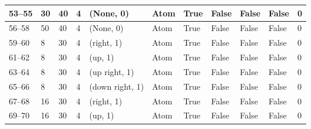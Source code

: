 \begin{longtable}{|C{0.9cm}|C{0.8cm}|C{0.8cm}|C{0.8cm}|C{3cm}|C{1.5cm}|C{1.5cm}|C{0.8cm}|C{0.8cm}|C{1cm}|C{1cm}|}
    53--55 &  30 &  40 &  4 & (None, 0) & Atom & True & False & False & False & 0 \\ \hline

    56--58 &  50 &  40 &  4 & (None, 0) & Atom & True & False & False & False & 0 \\ \hline
    
    
    59--60 &  8 &  30 &  4 & (right, 1) & Atom & True & False & False & False & 0 \\ \hline

    61--62 &  8 &  30 &  4 & (up, 1) & Atom & True & False & False & False & 0 \\ \hline

    63--64 &  8 &  30 &  4 & (up right, 1) & Atom & True & False & False & False & 0 \\ \hline

    65--66 &  8 &  30 &  4 & (down right, 1) & Atom & True & False & False & False & 0 \\ \hline

    67--68 &  16 &  30 &  4 & (right, 1) & Atom & True & False & False & False & 0 \\ \hline

    69--70 &  16 &  30 &  4 & (up, 1) & Atom & True & False & False & False & 0 \\ \hline


\end{longtable}
